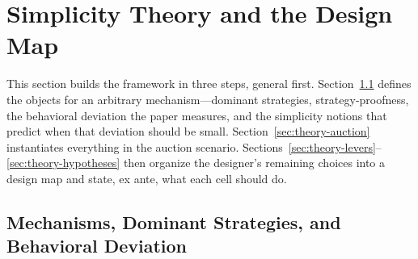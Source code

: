 
\section{Simplicity Theory and the Design Map}\label{sec:theory}

This section builds the framework in three steps, general first. Section~\ref{sec:theory-simplicity} defines the objects for an arbitrary mechanism---dominant strategies, strategy-proofness, the behavioral deviation the paper measures, and the simplicity notions that predict when that deviation should be small. Section~\ref{sec:theory-auction} instantiates everything in the auction scenario. Sections~\ref{sec:theory-levers}--\ref{sec:theory-hypotheses} then organize the designer's remaining choices into a design map and state, ex ante, what each cell should do.

\subsection{Mechanisms, Dominant Strategies, and Behavioral Deviation}\label{sec:theory-simplicity}

